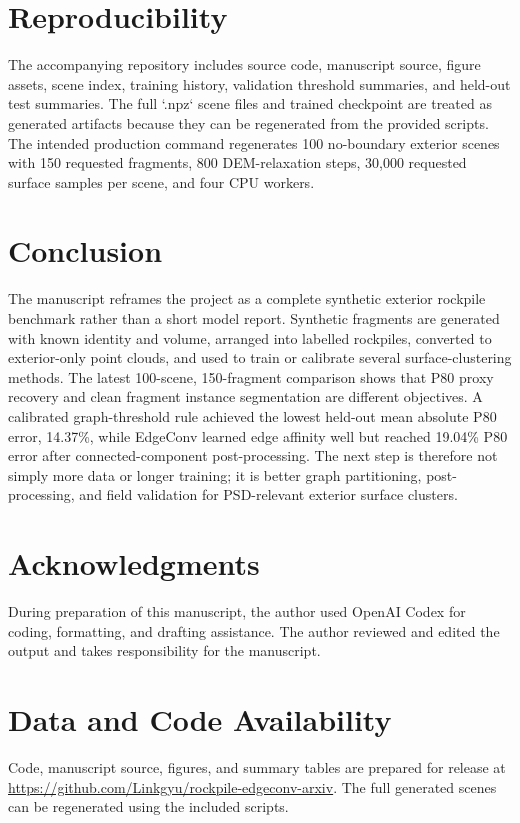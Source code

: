\documentclass[11pt]{article}
\begin{document}
\section{Reproducibility}
The accompanying repository includes source code, manuscript source, figure assets, scene index, training history, validation threshold summaries, and held-out test summaries. The full `.npz` scene files and trained checkpoint are treated as generated artifacts because they can be regenerated from the provided scripts. The intended production command regenerates 100 no-boundary exterior scenes with 150 requested fragments, 800 DEM-relaxation steps, 30,000 requested surface samples per scene, and four CPU workers.

\section{Conclusion}
The manuscript reframes the project as a complete synthetic exterior rockpile benchmark rather than a short model report. Synthetic fragments are generated with known identity and volume, arranged into labelled rockpiles, converted to exterior-only point clouds, and used to train or calibrate several surface-clustering methods. The latest 100-scene, 150-fragment comparison shows that P80 proxy recovery and clean fragment instance segmentation are different objectives. A calibrated graph-threshold rule achieved the lowest held-out mean absolute P80 error, 14.37\%, while EdgeConv learned edge affinity well but reached 19.04\% P80 error after connected-component post-processing. The next step is therefore not simply more data or longer training; it is better graph partitioning, post-processing, and field validation for PSD-relevant exterior surface clusters.

\section*{Acknowledgments}
During preparation of this manuscript, the author used OpenAI Codex for coding, formatting, and drafting assistance. The author reviewed and edited the output and takes responsibility for the manuscript.

\section*{Data and Code Availability}
Code, manuscript source, figures, and summary tables are prepared for release at \url{https://github.com/Linkgyu/rockpile-edgeconv-arxiv}. The full generated scenes can be regenerated using the included scripts.
\end{document}

